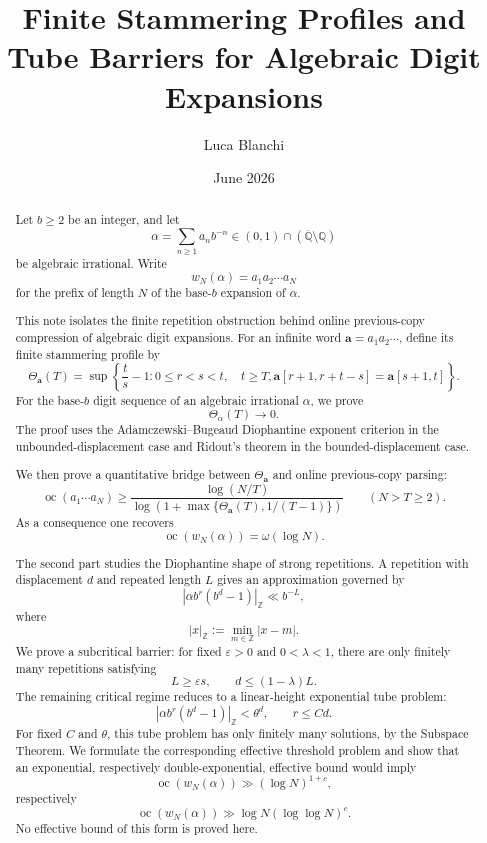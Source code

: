 \documentclass[11pt]{amsart}
\DeclareMathOperator{\oc}{oc}
\newcommand{\normZ}[1]{\left|#1\right|_{\mathbb Z}}
\begin{document}
\title[Finite Stammering Profiles and Tube Barriers]{Finite Stammering Profiles and Tube Barriers for Algebraic Digit Expansions}

\author{Luca Blanchi}

\date{June 2026}

\begin{abstract}
Let \(b\geq 2\) be an integer, and let
\[
\alpha=\sum_{n\geq 1}a_n b^{-n}
\in (0,1)\cap(\overline{\mathbb Q}\setminus\mathbb Q)
\]
be algebraic irrational. Write
\[
w_N(\alpha)=a_1a_2\cdots a_N
\]
for the prefix of length \(N\) of the base-\(b\) expansion of \(\alpha\).

This note isolates the finite repetition obstruction behind online previous-copy compression of algebraic digit expansions. For an infinite word \(\mathbf a=a_1a_2\cdots\), define its finite stammering profile by
\[
\Theta_{\mathbf a}(T)
=
\sup\left\{
\frac{t}{s}-1:
0\leq r<s<t,\quad t\geq T,
\mathbf a[r+1,r+t-s]=\mathbf a[s+1,t]
\right\}.
\]
For the base-\(b\) digit sequence of an algebraic irrational \(\alpha\), we prove
\[
\Theta_\alpha(T)\to 0.
\]
The proof uses the Adamczewski--Bugeaud Diophantine exponent criterion in the unbounded-displacement case and Ridout's theorem in the bounded-displacement case.

We then prove a quantitative bridge between \(\Theta_{\mathbf a}\) and online previous-copy parsing:
\[
\oc(a_1\cdots a_N)
\geq
\frac{\log(N/T)}
{\log\left(1+\max\{\Theta_{\mathbf a}(T),1/(T-1)\}\right)}
\qquad(N>T\geq 2).
\]
As a consequence one recovers
\[
\oc(w_N(\alpha))=\omega(\log N).
\]

The second part studies the Diophantine shape of strong repetitions. A repetition with displacement \(d\) and repeated length \(L\) gives an approximation governed by
\[
\normZ{\alpha b^r(b^d-1)}\ll b^{-L},
\]
where
\[
\normZ{x}:=\min_{m\in\mathbb Z}|x-m|.
\]
We prove a subcritical barrier: for fixed \(\varepsilon>0\) and \(0<\lambda<1\), there are only finitely many repetitions satisfying
\[
L\geq \varepsilon s,
\qquad
d\leq (1-\lambda)L.
\]
The remaining critical regime reduces to a linear-height exponential tube problem:
\[
\normZ{\alpha b^r(b^d-1)}<\theta^d,
\qquad
r\leq Cd.
\]
For fixed \(C\) and \(\theta\), this tube problem has only finitely many solutions, by the Subspace Theorem. We formulate the corresponding effective threshold problem and show that an exponential, respectively double-exponential, effective bound would imply
\[
\oc(w_N(\alpha))\gg(\log N)^{1+c},
\]
respectively
\[
\oc(w_N(\alpha))\gg \log N(\log\log N)^c.
\]
No effective bound of this form is proved here.
\end{abstract}
\end{document}
